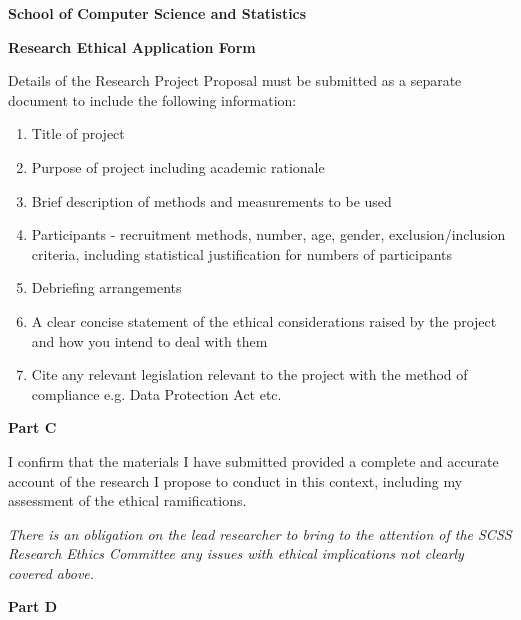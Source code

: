 \begin{tcolorbox}
    \begin{center}
        \textbf{\large School of Computer Science and Statistics}

        \textbf{\large Research Ethical Application Form}
    \end{center}
\end{tcolorbox}
\vspace{0.25cm}

Details of the Research Project Proposal must be submitted as a separate document to include the following information:
\begin{enumerate}
    \item Title of project
    \item Purpose of project including academic rationale
    \item Brief description of methods and measurements to be used
    \item Participants - recruitment methods, number, age, gender, exclusion/inclusion criteria, including statistical justification for numbers of participants
    \item Debriefing arrangements
    \item A clear concise statement of the ethical considerations raised by the project and how you intend to deal with them
    \item Cite any relevant legislation relevant to the project with the method of compliance e.g. Data Protection Act etc.
\end{enumerate}

\begin{tcolorbox}
    \centering
    \textbf{Part C}
\end{tcolorbox}

I confirm that the materials I have submitted provided a complete and accurate account of the research I propose to conduct in this context, including my assessment of the ethical ramifications.


\vspace{0.5cm}
\textit{There is an obligation on the lead researcher to bring to the attention of the SCSS Research Ethics Committee any issues with ethical implications not clearly covered above.}

\begin{tcolorbox}
    \centering
    \textbf{Part D}
\end{tcolorbox}


